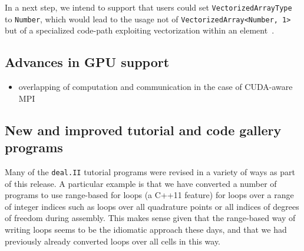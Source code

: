 \documentclass{ansarticle-preprint}
\newcommand{\specialword}[1]{\texttt{#1}}
\newcommand{\dealii}{{\specialword{deal.II}}\xspace}
\begin{document}
In a next step, we intend to support that users could set 
\texttt{VectorizedArrayType} to \texttt{Number}, which would lead to the usage not 
of \texttt{VectorizedArray<Number, 1>} but of a specialized code-path exploiting 
vectorization within an element~\cite{KronbichlerKormann2019}.

\subsection{Advances in GPU support}
\label{subsec:gpu}

\begin{itemize}
\item overlapping of computation and communication in the case of CUDA-aware MPI
\end{itemize}


\subsection{New and improved tutorial and code gallery programs}
\label{subsec:steps}

Many of the \dealii{} tutorial programs were revised in a variety of
ways as part of this release. A particular example is that we have
converted a number of programs to use range-based for loops (a C++11
feature) for loops over a range of integer indices such as loops over
all quadrature points or all indices of degrees of freedom during
assembly. This makes sense given that the
range-based way of writing loops seems to be the idiomatic approach
these days, and that we had previously already converted loops over
all cells in this way.
\end{document}
